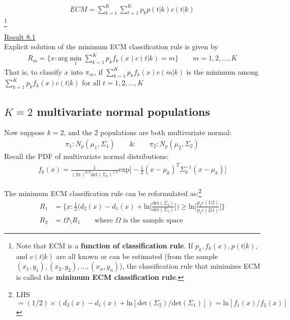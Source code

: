 \documentclass[12pt]{extarticle}
\newcommand{\<}{\langle}
\renewcommand{\>}{\rangle}
\theoremstyle{definition}
\begin{document}
\newpage
\begin{tcolorbox}[enhanced, drop fuzzy shadow, title=ECM: Expected Cost of Missclassification]
\begin{align*}
    ECM=\sum^K_{k=1}\sum^K_{t=1} p_k p(t|k) c(t|k)
\end{align*}
\footnote{Note that ECM is a \textbf{function of classification rule}. If $p_k, f_k(x), p(t|k),$ and $c(t|k)$ are all known or can be estimated (from the sample $(x_1, y_1),(x_2, y_2),...,(x_n, y_n)$), the classification rule that minimizes ECM is called the \textbf{minimum ECM classification rule}.}
\end{tcolorbox}
\underline{Result 8.1}\\
Explicit solution of the minimum ECM classification rule is given by
\begin{align*}
    R_m = \{x: \text{arg}\min_t \sum^K_{k=1}p_k f_k(x) c(t|k) =m \} \qquad m=1,2,...,K
\end{align*}
That is, to classify $x$ into $\pi_m$, if $\sum^K_{k=1}p_k f_k(x) c(m|k)$ is the minimum among $\sum^K_{k=1}p_k f_k(x) c(t|k)$ for all $t=1,2,...,K$

\subsection{$K=2$ multivariate normal populations}
Now suppose $k=2$, and the 2 populations are both multivariate normal:
\begin{align*}
    \pi_1: N_p(\mu_1,\Sigma_1) \qquad \& \qquad \pi_2: N_p(\mu_2,\Sigma_2)
\end{align*}
Recall the PDF of multivariate normal distributions:
\begin{align*}
    f_k(x) = \frac{1}{(2\pi)^{p/2} \text{det}(\Sigma_k)^{1/2}} \text{exp}\bigg[-\frac{1}{2}(x-\mu_k)^T\Sigma^{-1}_k (x-\mu_k) \bigg]
\end{align*}

\begin{tcolorbox}[enhanced, drop fuzzy shadow, title=Minimum ECM when K is 2; MVN]
The minimum ECM classification rule can be reformulated as:\footnote{LHS $= (1/2) \times (d_2(x)-d_1(x) +\text{ln}[\text{det}(\Sigma_2)/ \text{det}(\Sigma_1)]) = \text{ln}[f_1(x)/f_2(x)]$}
\begin{align*}
    R_1 &= \Bigg\{x:\frac{1}{2}\bigg( d_2(x)-d_1(x) +\text{ln}\bigg[ \frac{\text{det}(\Sigma_2)}{\text{det}(\Sigma_1)}\bigg]\bigg) \geq \text{ln}\bigg[\frac{p_2 c(1|2)}{p_1 c(2|1)}\bigg] \Bigg\}  \\
    R_2 &= \Omega \setminus R_1 \qquad \text{where $\Omega$ is the sample space}
\end{align*}
\end{tcolorbox}
\end{document}
